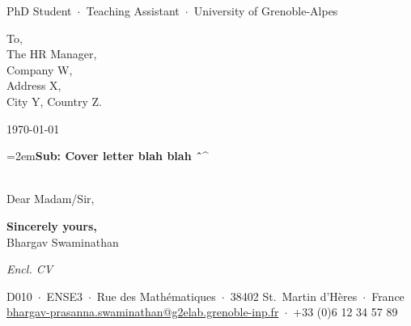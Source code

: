 \documentclass{scrartcl}
\newcommand{\ToAddr}[1]{\vspace{2.5em}\noindent To,\\ #1}
\newcommand{\LetterDate}[1]{\hfill #1\par\vspace{2em}}
\newcommand{\Subject}[1]{\hangindent=2em\hangafter=0\justifying\textbf{Sub: #1}\par\vspace{0.5em}}
\newcommand{\Opening}[1]{\justifying #1\par\vspace{1em}}
\newcommand{\Sign}[1]{\vspace{2em}\noindent\textbf{Sincerely yours,}\vspace{1em}\\#1\par\vspace{0.5em}}
\newcommand{\Encl}[1]{\vspace{2em}\noindent\footnotesize\color{Maroon}\emph{Encl. #1}\par\vspace{0.5em}}
\renewcommand{\cfoot}[3]{\centering\normalsize\vspace{4.5em} #1\\#2\ $\cdotp$\ #3}
\begin{document}
\date{} %

\thispagestyle{empty}
\centering
\begin{cv}{%
}\vspace{0.75em}
{\large\color{Maroon} PhD Student\ $\cdotp$\ Teaching Assistant\ $\cdotp$\ University of Grenoble-Alpes}\vspace{1.5em} %

\justifying

\ToAddr{The HR Manager,\\ Company W,\\ Address X,\\ City Y, Country Z.\\}

\vspace{1em}

\LetterDate{\today}

\Subject{Cover letter blah blah \^\ \^}

\vspace{1em}
\ \\
\Opening{Dear Madam/Sir,}

\lipsum[1-3]

\Sign{Bhargav Swaminathan}
\Encl{CV}
\cfoot{D010\ $\cdotp$\ ENSE3\ $\cdotp$\ Rue des Math\'{e}matiques\ $\cdotp$\ 38402 St.~Martin d'H\`{e}res\ $\cdotp$\ France}{\href{mailto:bhargav-prasanna.swaminathan@g2elab.grenoble-inp.fr}{bhargav-prasanna.swaminathan@g2elab.grenoble-inp.fr}}{+33 (0)6 12 34 57 89}

\end{cv}
\end{document}
